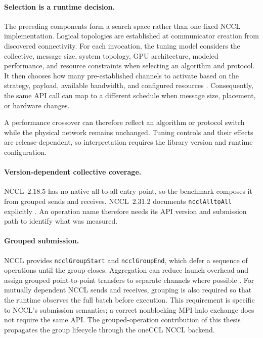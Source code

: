 \paragraph{Selection is a runtime decision.} The preceding components form a search space rather than one fixed NCCL implementation. Logical topologies are established at communicator creation from discovered connectivity. For each invocation, the tuning model considers the collective, message size, system topology, GPU architecture, modeled performance, and resource constraints when selecting an algorithm and protocol. It then chooses how many pre-established channels to activate based on the strategy, payload, available bandwidth, and configured resources \cite{hu_demystifying_2025}. Consequently, the same API call can map to a different schedule when message size, placement, or hardware changes.

A performance crossover can therefore reflect an algorithm or protocol switch while the physical network remains unchanged. Tuning controls and their effects are release-dependent, so interpretation requires the library version and runtime configuration.

\paragraph{Version-dependent collective coverage.} NCCL~2.18.5 has no native all-to-all entry point, so the benchmark composes it from grouped sends and receives. NCCL~2.31.2 documents \texttt{ncclAlltoAll} explicitly \cite{nvidia_nccl_collectives_2026}. An operation name therefore needs its API version and submission path to identify what was measured.

\paragraph{Grouped submission.} NCCL provides \texttt{ncclGroupStart} and \texttt{ncclGroupEnd}, which defer a sequence of operations until the group closes. Aggregation can reduce launch overhead and assign grouped point-to-point transfers to separate channels where possible \cite{hu_demystifying_2025}. For mutually dependent NCCL sends and receives, grouping is also required so that the runtime observes the full batch before execution. This requirement is specific to NCCL's submission semantics; a correct nonblocking MPI halo exchange does not require the same API. The grouped-operation contribution of this thesis propagates the group lifecycle through the oneCCL NCCL backend.

